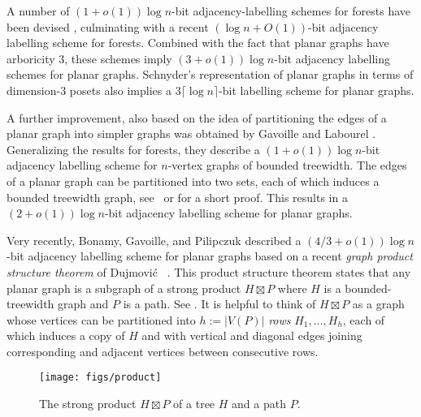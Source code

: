 \documentclass[kpfonts]{patmorin}
\begin{document}
A number of $(1+o(1))\log n$-bit adjacency-labelling schemes for forests have been devised \cite{chung:universal, alstrup.rauhe:improved,alstrup.dahlgaard.ea:optimal}, culminating with a recent $(\log n + O(1))$-bit adjacency labelling scheme \cite{alstrup.dahlgaard.ea:optimal} for forests.  Combined with the fact that planar graphs have arboricity 3, these schemes imply $(3+o(1))\log n$-bit adjacency labelling schemes for planar graphs.  Schnyder's representation of planar graphs in terms of dimension-3 posets \cite{schnyder:planar} also implies a $3\lceil\log n\rceil$-bit labelling scheme for planar graphs.

A further improvement, also based on the idea of partitioning the edges of a planar graph into simpler graphs was obtained by Gavoille and Labourel \cite{gavoille.labourel:shorter}.  Generalizing the results for forests, they describe a $(1+o(1))\log n$-bit adjacency labelling scheme for $n$-vertex graphs of bounded treewidth.  The edges of a planar graph can be partitioned into two sets, each of which induces a bounded treewidth graph, see~\cite{DeVos.et.al} or \cite{dujmovic.joret.ea:planar} for a short proof.  This results in a $(2+o(1))\log n$-bit adjacency labelling scheme for planar graphs.

Very recently, Bonamy, Gavoille, and Pilipczuk \cite{bonamy.gavoille.ea:shorter} described a $(4/3+o(1))\log n$-bit adjacency labelling scheme for planar graphs based on a recent \emph{graph product structure theorem} of Dujmović \etal\ \cite{dujmovic.joret.ea:planar}.  This product structure theorem states that any planar graph is a subgraph of a strong product $H\boxtimes P$ where $H$ is a bounded-treewidth graph and $P$ is a path. See . It is helpful to think of $H\boxtimes P$ as a graph whose vertices can be partitioned into $h:=|V(P)|$ \emph{rows} $H_1,\ldots,H_{h}$, each of which induces a copy of $H$ and with vertical and diagonal edges joining corresponding and adjacent vertices between consecutive rows.  

\begin{figure}[htbp]
  \begin{center}
    \texttt{[image: figs/product]}
  \end{center}
  \caption{The strong product $H\boxtimes P$ of a tree $H$ and a path $P$.}
\end{figure}  
\end{document}
